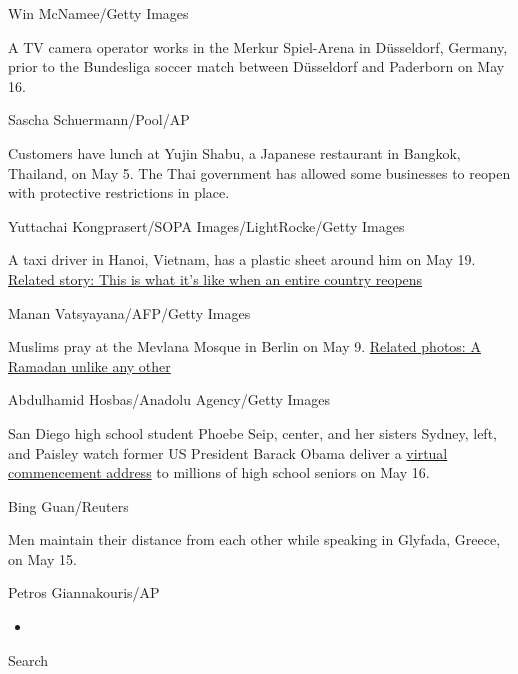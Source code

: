 Win McNamee/Getty Images

A TV camera operator works in the Merkur Spiel-Arena in Düsseldorf,
Germany, prior to the Bundesliga soccer match between Düsseldorf and
Paderborn on May 16.

Sascha Schuermann/Pool/AP

Customers have lunch at Yujin Shabu, a Japanese restaurant in Bangkok,
Thailand, on May 5. The Thai government has allowed some businesses to
reopen with protective restrictions in place.

Yuttachai Kongprasert/SOPA Images/LightRocke/Getty Images

A taxi driver in Hanoi, Vietnam, has a plastic sheet around him on May
19.
\href{https://www.cnn.com/travel/article/life-after-lockdown-vietnam-domestic-travel/index.html}{Related
story: This is what it's like when an entire country reopens}

Manan Vatsyayana/AFP/Getty Images

Muslims pray at the Mevlana Mosque in Berlin on May 9.
\href{http://www.cnn.com/2020/04/23/world/gallery/ramadan-2020/index.html}{Related
photos: A Ramadan unlike any other}

Abdulhamid Hosbas/Anadolu Agency/Getty Images

San Diego high school student Phoebe Seip, center, and her sisters
Sydney, left, and Paisley watch former US President Barack Obama deliver
a
\href{https://www.cnn.com/2020/05/16/us/lebron-james-class-of-2020-graduation/index.html}{virtual
commencement address} to millions of high school seniors on May 16.

Bing Guan/Reuters

Men maintain their distance from each other while speaking in Glyfada,
Greece, on May 15.

Petros Giannakouris/AP

\begin{itemize}
\item
\end{itemize}

Search

